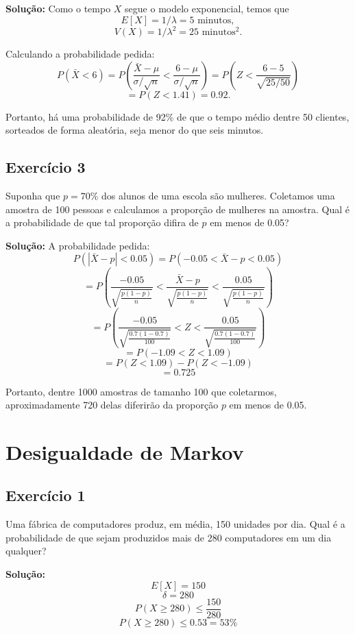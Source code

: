 \documentclass{article}
\begin{document}
\vspace{0.5cm}
\textbf{Solução:} 
Como o tempo $X$ segue o modelo exponencial, temos que 
    $$E[X] = 1/\lambda = 5 \text{ minutos},$$
    $$V(X) = 1/\lambda^2 = 25 \text{ minutos}^2.$$

Calculando a probabilidade pedida:
    $$
    P(\bar{X} < 6) = P\left(\frac{\bar{X} - \mu}{\sigma/\sqrt{n}} < \frac{6 - \mu}{\sigma/\sqrt{n}}\right) = 
    P\left(Z < \frac{6 - 5}{\sqrt{25/50}}\right)
    $$
    $$
    = P(Z < 1.41) = 0.92.
    $$

Portanto, há uma probabilidade de 92\% de que o tempo médio dentre 50 clientes, sorteados de forma aleatória, seja menor do que seis minutos.

\subsection{Exercício 3}
Suponha que $p = 70\%$ dos alunos de uma escola são mulheres. Coletamos uma amostra de 100 pessoas e calculamos a proporção de mulheres na amostra. Qual é a probabilidade de que tal proporção difira de $p$ em menos de 0.05?

\vspace{0.5cm}
\textbf{Solução:} 
A probabilidade pedida:
    $$
    P(|\bar{X} - p| < 0.05) = P(-0.05 < \bar{X} - p < 0.05)
    $$
    $$
    = P\left( \frac{-0.05}{\sqrt{\frac{p(1-p)}{n}}} < \frac{\bar{X} - p}{\sqrt{\frac{p(1-p)}{n}}} < \frac{0.05}{\sqrt{\frac{p(1-p)}{n}}} \right)
    $$
    $$
    = P\left( \frac{-0.05}{\sqrt{\frac{0.7(1-0.7)}{100}}} < Z < \frac{0.05}{\sqrt{\frac{0.7(1-0.7)}{100}}} \right)
    $$
    $$
    = P(-1.09 < Z < 1.09)
    $$
    $$
    = P(Z < 1.09) - P(Z < -1.09)
    $$
    $$
    = 0.725
    $$

Portanto, dentre 1000 amostras de tamanho 100 que coletarmos, aproximadamente 720 delas diferirão da proporção $p$ em menos de 0.05.

\section{Desigualdade de Markov}
\subsection{Exercício 1}
Uma fábrica de computadores produz, em média, 150 unidades por dia.
Qual é a probabilidade de que sejam produzidos mais de 280 computadores em um dia qualquer?

\vspace{0.5cm}
\textbf{Solução:} 
    $$
    E[X] = 150
    $$
    $$
    \delta = 280
    $$
    $$
    P(X \geq 280) \leq \frac{150}{280}
    $$
    $$
    P(X \geq 280) \leq 0.53 = 53\%
    $$
\end{document}
